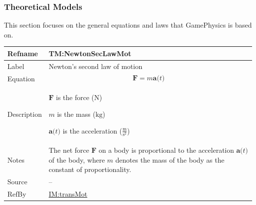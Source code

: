 \documentclass[12pt]{article}
\begin{document}
\subsubsection{Theoretical Models}
\label{Sec:TMs}
This section focuses on the general equations and laws that GamePhysics is based on.

\medskip
\noindent
\begin{minipage}{\textwidth}
\begin{tabular}{>{\raggedright}p{}>{\raggedright\arraybackslash}p{}}
\toprule \textbf{Refname} & \textbf{TM:NewtonSecLawMot}
\label{TM:NewtonSecLawMot}
\\ \midrule
Label & Newton's second law of motion
        
\\ \midrule
Equation & \begin{displaymath}
           \symbf{F}=m \symbf{a}\text{(}t\text{)}
           \end{displaymath}
\\ \midrule
Description & \begin{symbDescription}
              \item{$\symbf{F}$ is the force (${\text{N}}$)}
              \item{$m$ is the mass (${\text{kg}}$)}
              \item{$\symbf{a}\text{(}t\text{)}$ is the acceleration ($\frac{\text{m}}{\text{s}^{2}}$)}
              \end{symbDescription}
\\ \midrule
Notes & The net force $\symbf{F}$ on a body is proportional to the acceleration $\symbf{a}\text{(}t\text{)}$ of the body, where $m$ denotes the mass of the body as the constant of proportionality.
        
\\ \midrule
Source & --
         
\\ \midrule
RefBy & \hyperref[IM:transMot]{IM:transMot}
        
\\ \bottomrule
\end{tabular}
\end{minipage}
\end{document}

